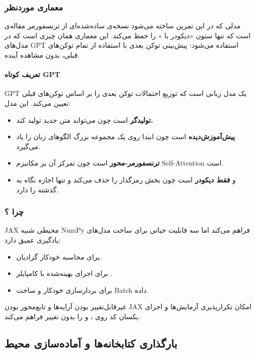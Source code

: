 \documentclass{article}
\begin{document}
\subsubsection*{معماری موردنظر}
مدلی که در این تمرین ساخته می‌شود نسخه‌ی ساده‌شده‌ای از ترنسفورمر مقاله‌ی
است که تنها ستون «دیکودر با » را حفظ می‌کند. این معماری همان چیزی است که در مدل‌های GPT استفاده می‌شود: پیش‌بینی توکن بعدی با استفاده از تمام توکن‌های قبلی، بدون مشاهده آینده.

\paragraph{تعریف کوتاه GPT}
GPT یک مدل زبانی است که توزیع احتمالات توکن بعدی را بر اساس توکن‌های قبلی تعیین می‌کند. این مدل:
\begin{itemize}
	\item \textbf{تولیدگر} است چون می‌تواند متن جدید تولید کند،
	\item \textbf{پیش‌آموزش‌دیده} است چون ابتدا روی یک مجموعه بزرگ الگوهای زبان را یاد می‌گیرد.
	\item \textbf{ترنسفورمر-محور} است چون تمرکز آن بر مکانیزم Self-Attention است.
	\item و \textbf{فقط دیکودر} است چون بخش رمزگذار را حذف می‌کند و تنها اجازه نگاه به گذشته را دارد.
\end{itemize}

\subsubsection*{چرا ؟}
JAX محیطی شبیه NumPy فراهم می‌کند اما سه قابلیت حیاتی برای ساخت مدل‌های یادگیری عمیق دارد:
\begin{itemize}
	\item {} برای محاسبه خودکار گرادیان.
	\item {} برای اجرای بهینه‌شده با کامپایلر .
	\item {} برای بردارسازی خودکار و ساخت Batch داده.
\end{itemize}

غیرقابل‌تغییر بودن آرایه‌ها و تابع‌محور بودن JAX امکان تکرارپذیری آزمایش‌ها و اجرای یکسان کد روی   ، و  را بدون تغییر فراهم می‌کند.
\subsection{بارگذاری کتابخانه‌ها و آماده‌سازی محیط}
\end{document}
